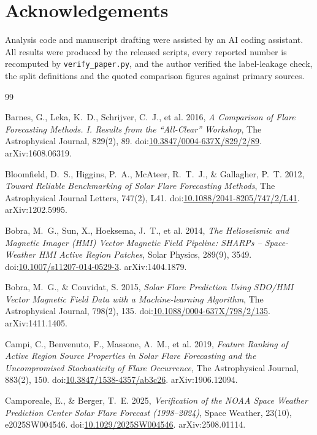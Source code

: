 \documentclass[11pt]{article}
\newcommand{\code}[1]{\texttt{#1}}
\newcommand{\doi}[1]{doi:\href{https://doi.org/#1}{#1}}
\begin{document}
\section*{Acknowledgements}

Analysis code and manuscript drafting were assisted by an AI coding
assistant. All results were produced by the released scripts, every
reported number is recomputed by \code{verify\_paper.py}, and the author
verified the label-leakage check, the split definitions and the quoted
comparison figures against primary sources.

\begin{thebibliography}{99}

Barnes, G., Leka, K.~D., Schrijver, C.~J., et al. 2016,
\emph{A Comparison of Flare Forecasting Methods. I. Results from the ``All-Clear'' Workshop},
The Astrophysical Journal, 829(2), 89.
\doi{10.3847/0004-637X/829/2/89}. arXiv:1608.06319.

Bloomfield, D.~S., Higgins, P.~A., McAteer, R.~T.~J., \& Gallagher, P.~T. 2012,
\emph{Toward Reliable Benchmarking of Solar Flare Forecasting Methods},
The Astrophysical Journal Letters, 747(2), L41.
\doi{10.1088/2041-8205/747/2/L41}. arXiv:1202.5995.

Bobra, M.~G., Sun, X., Hoeksema, J.~T., et al. 2014,
\emph{The Helioseismic and Magnetic Imager (HMI) Vector Magnetic Field Pipeline:
SHARPs -- Space-Weather HMI Active Region Patches},
Solar Physics, 289(9), 3549. \doi{10.1007/s11207-014-0529-3}. arXiv:1404.1879.

Bobra, M.~G., \& Couvidat, S. 2015,
\emph{Solar Flare Prediction Using SDO/HMI Vector Magnetic Field Data with a
Machine-learning Algorithm},
The Astrophysical Journal, 798(2), 135. \doi{10.1088/0004-637X/798/2/135}.
arXiv:1411.1405.

Campi, C., Benvenuto, F., Massone, A.~M., et al. 2019,
\emph{Feature Ranking of Active Region Source Properties in Solar Flare
Forecasting and the Uncompromised Stochasticity of Flare Occurrence},
The Astrophysical Journal, 883(2), 150. \doi{10.3847/1538-4357/ab3c26}.
arXiv:1906.12094.

Camporeale, E., \& Berger, T.~E. 2025,
\emph{Verification of the NOAA Space Weather Prediction Center Solar Flare
Forecast (1998--2024)},
Space Weather, 23(10), e2025SW004546. \doi{10.1029/2025SW004546}.
arXiv:2508.01114.


\end{thebibliography}
\end{document}
